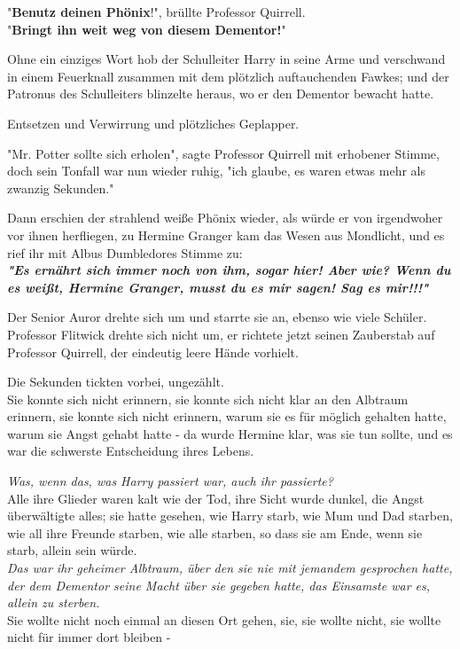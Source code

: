 {"\textbf{Benutz deinen Phönix}!", brüllte Professor Quirrell.\\ "\textbf{Bringt ihn weit weg von diesem Dementor!}"

Ohne ein einziges Wort hob der Schulleiter Harry in seine Arme und verschwand in einem Feuerknall zusammen mit dem plötzlich auftauchenden Fawkes; und der Patronus des Schulleiters blinzelte heraus, wo er den Dementor bewacht hatte.

Entsetzen und Verwirrung und plötzliches Geplapper.

"Mr. Potter sollte sich erholen", sagte Professor Quirrell mit erhobener Stimme, doch sein Tonfall war nun wieder ruhig, "ich glaube, es waren etwas mehr als zwanzig Sekunden."

Dann erschien der strahlend weiße Phönix wieder, als würde er von irgendwoher vor ihnen herfliegen, zu Hermine Granger kam das Wesen aus Mondlicht, und es rief ihr mit Albus Dumbledores Stimme zu:\\

\textbf{\emph{"Es ernährt sich immer noch von ihm, sogar hier! Aber wie? Wenn du es weißt, Hermine Granger, musst du es mir sagen! Sag es mir!!!"}}

Der Senior Auror drehte sich um und starrte sie an, ebenso wie viele Schüler.\\ Professor Flitwick drehte sich nicht um, er richtete jetzt seinen Zauberstab auf Professor Quirrell, der eindeutig leere Hände vorhielt.

Die Sekunden tickten vorbei, ungezählt.\\ Sie konnte sich nicht erinnern, sie konnte sich nicht klar an den Albtraum erinnern, sie konnte sich nicht erinnern, warum sie es für möglich gehalten hatte, warum sie Angst gehabt hatte - da wurde Hermine klar, was sie tun sollte, und es war die schwerste Entscheidung ihres Lebens.

\emph{Was, wenn das, was Harry passiert war, auch ihr passierte?}\\ Alle ihre Glieder waren kalt wie der Tod, ihre Sicht wurde dunkel, die Angst überwältigte alles; sie hatte gesehen, wie Harry starb, wie Mum und Dad starben, wie all ihre Freunde starben, wie alle starben, so dass sie am Ende, wenn sie starb, allein sein würde.\\ \emph{Das war ihr geheimer Albtraum, über den sie nie mit jemandem gesprochen hatte, der dem Dementor seine Macht über sie gegeben hatte, das Einsamste war es, allein zu sterben.}\\ Sie wollte nicht noch einmal an diesen Ort gehen, sie, sie wollte nicht, sie wollte nicht für immer dort bleiben -

}
